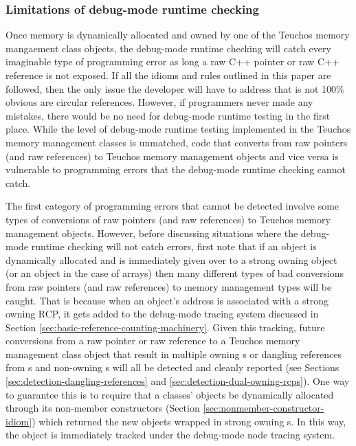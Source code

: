 \documentclass[pdf,ps2pdf,11pt]{SANDreport}
\begin{document}
%
{}\subsubsection{Limitations of debug-mode runtime checking}
\label{sec:limitations-debug-mode-checking}
%

Once memory is dynamically allocated and owned by one of the Teuchos
memory mangaement class objects, the debug-mode runtime checking will
catch every imaginable type of programming error as long a raw C++
pointer or raw C++ reference is not exposed.  If all the idioms and
rules outlined in this paper are followed, then the only issue the
developer will have to address that is not 100\% obvious are circular
references.  However, if programmers never made any mistakes, there
would be no need for debug-mode runtime testing in the first place.
While the level of debug-mode runtime testing implemented in the
Teuchos memory management classes is unmatched, code that converts
from raw pointers (and raw references) to Teuchos memory management
objects and vice versa is vulnerable to programming errors that the
debug-mode runtime checking cannot catch.

The first category of programming errors that cannot be detected
involve some types of conversions of raw pointers (and raw references)
to Teuchos memory management objects.  However, before discussing
situations where the debug-mode runtime checking will not catch
errors, first note that if an object is dynamically allocated and is
immediately given over to a strong owning {} object (or an
{} object in the case of arrays) then many different
types of bad conversions from raw pointers (and raw references) to
memory management types will be caught.  That is because when an
object's address is associated with a strong owning RCP, it gets added
to the debug-mode {} tracing system discussed in Section
{}\ref{sec:basic-reference-counting-machinery}.  Given this tracking,
future conversions from a raw pointer or raw reference to a Teuchos
memory management class object that result in multiple owning
{}s or dangling references from {}s and non-owning
{}s will all be detected and cleanly reported (see Sections
{}\ref{sec:detection-dangling-references} and
{}\ref{sec:detection-dual-owning-rcps}).  One way to guarantee this is
to require that a classes' objects be dynamically allocated through
its non-member constructors (Section
{}\ref{sec:nonmember-constructor-idiom}) which returned the new
objects wrapped in strong owning {}s.  In this way, the
object is immediately tracked under the debug-mode node tracing
system.
\end{document}
